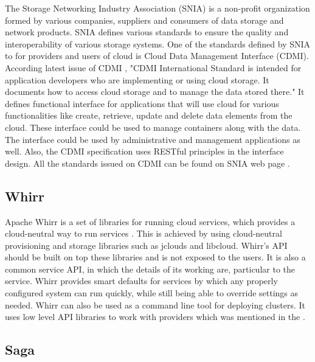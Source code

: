      The Storage Networking Industry Association (SNIA)
     \cite{www-sniawebsite} is a non-profit organization formed by
     various companies, suppliers and consumers of data storage and
     network products. SNIA defines various standards to ensure the
     quality and interoperability of various storage systems. One of
     the standards defined by SNIA to for providers and users of cloud
     is Cloud Data Management Interface (CDMI). According latest issue
     of CDMI \cite{cdmi-manual}, "CDMI International Standard is
     intended for application developers who are implementing or using
     cloud storage. It documents how to access cloud storage and to
     manage the data stored there." It defines functional interface
     for applications that will use cloud for various functionalities
     like create, retrieve, update and delete data elements from the
     cloud. These interface could be used to manage containers along
     with the data. The interface could be used by administrative and
     management applications as well. Also, the CDMI specification
     uses RESTful principles in the interface design. All the
     standards issued on CDMI can be found on SNIA web page
     \cite{www-cdmiwebsite}.
     
\subsection{ Whirr}
     
     Apache Whirr is a set of libraries for running cloud services,
     which provides a cloud-neutral way to run services
     \cite{www-ApacheWhirr}. This is achieved by using cloud-neutral
     provisioning and storage libraries such as jclouds and
     libcloud. Whirr's API should be built on top these libraries and
     is not exposed to the users. It is also a common service API, in
     which the details of its working are, particular to the service.
     Whirr provides smart defaults for services by which any properly
     configured system can run quickly, while still being able to
     override settings as needed. Whirr can also be used as a command
     line tool for deploying clusters. It uses low level API libraries
     to work with providers which was mentioned in the
     \cite{www-slideshare-ApacheWhirr}.

     
\subsection{ Saga}

